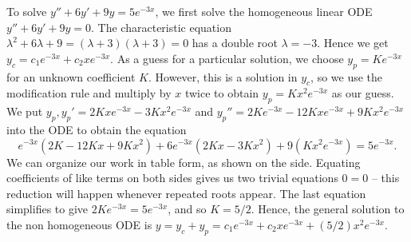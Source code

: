 \begin{example}
To solve $y''+6y'+9y=5e^{-3x}$, we first solve the homogeneous linear ODE $y''+6y'+9y=0$. The characteristic equation $\lambda^2+6\lambda+9=(\lambda+3)(\lambda+3)=0$ has a double root $\lambda=-3$.  Hence we get $y_c = c_1e^{-3x}+c_2xe^{-3x}$. As a guess for a particular solution, we choose $y_p=Ke^{-3x}$ for an unknown coefficient $K$. However, this is a solution in $y_c$, so we use the modification rule and multiply by $x$ twice to obtain $y_p=Kx^2e^{-3x}$ as our guess. We put $y_p, y_p' = 2 Kx{e^{-3x}}-3K{x}^{2}{e^{-3x}}$ and $y_p'' = 2K{e^{-3x}}-12Kx{e^{-3x}}+9K{x}^{2}{e^{-3x}}$ into the ODE to obtain the equation 
$$ {e^{-3x}}(2K-12Kx+9K{x}^{2})+6{e^{-3x}}(2 Kx-3K{x}^{2})+9(Kx^2e^{-3x})=5e^{-3x} .$$
We can organize our work in table form, as shown on the side. 
Equating coefficients of like terms on both sides gives us two trivial equations $0=0$ -- this reduction will happen whenever repeated roots appear. The last equation simplifies to give $2 K{e^{-3x}} = 5e^{-3x}$, and so $K=5/2$. Hence, the general solution to the non homogeneous ODE is $y=y_c+y_p = c_1e^{-3x}+c_2xe^{-3x} + (5/2)x^2e^{-3x}$.

\end{example}

